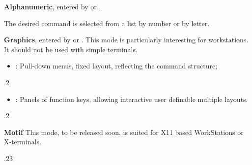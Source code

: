 {\bf Alphanumeric}, entered by  or .

The desired command is selected from a list by number or by letter.

{\bf Graphics}, entered by  or .
This mode is particularly interesting for workstations.
It should not be used with simple terminals.
 
\begin{minipage}{.49\textwidth}
\begin{itemize}
\item {}: Pull-down menus,
fixed layout, reflecting the command structure;
\end{itemize}
\end{minipage} \hfill
\begin{minipage}{.49\textwidth}
\begin{Fighere}
\begin{center}
\mbox{\epsfysize.2\textheight{}}
\end{center}
\end{Fighere}
\end{minipage} 

\begin{minipage}[t]{.49\textwidth}
\begin{itemize}
\item {}: Panels of function keys, allowing
interactive user definable multiple layouts.
\end{itemize}
\end{minipage} \hfill
\begin{minipage}{.49\textwidth}
\begin{Fighere}
\begin{center}
\mbox{\epsfysize.2\textheight{}}
\end{center}
\end{Fighere}
\end{minipage} 

\begin{minipage}[t]{.49\textwidth}
{\bf Motif}
This mode, to be released soon, is suited for X11 based WorkStations
or X-terminals.
\end{minipage} \hfill
\begin{minipage}{.49\textwidth}
\begin{Fighere}
\begin{center}
\mbox{\epsfysize.23\textheight{}}
\end{center}
\end{Fighere}
\end{minipage} 

